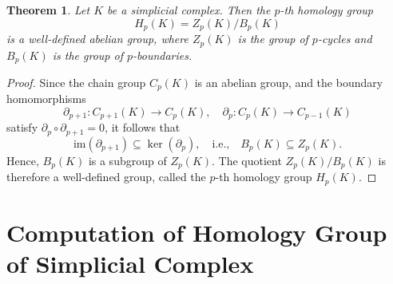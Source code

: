 \documentclass[12pt,oneside,reqno]{amsart}
\theoremstyle{plain}
\newtheorem{theorem}{Theorem}[section]
\theoremstyle{definition}
\theoremstyle{remark}
\newcommand{\0}{{\textbf{0}}}
\begin{document}
\begin{theorem}
Let $K$ be a simplicial complex. Then the $p$-th homology group
\[
H_p(K) = Z_p(K)/B_p(K)
\]
is a well-defined abelian group, where $Z_p(K)$ is the group of $p$-cycles and $B_p(K)$ is the group of $p$-boundaries.
\end{theorem}

\begin{proof}
Since the chain group $C_p(K)$ is an abelian group, and the boundary homomorphisms
\[
\partial_{p+1} \colon C_{p+1}(K) \to C_p(K), \quad \partial_p \colon C_p(K) \to C_{p-1}(K)
\]
satisfy $\partial_p \circ \partial_{p+1} = 0$, it follows that
\[
\text{im}(\partial_{p+1}) \subseteq \ker(\partial_p), \quad \text{i.e.,} \quad B_p(K) \subseteq Z_p(K).
\]
Hence, $B_p(K)$ is a subgroup of $Z_p(K)$. The quotient $Z_p(K)/B_p(K)$ is therefore a well-defined group, called the $p$-th homology group $H_p(K)$.
\end{proof}

\section{Computation of Homology Group of Simplicial Complex}\label{s:Computation of Homology Group of Simplicial Complex}
\end{document}
